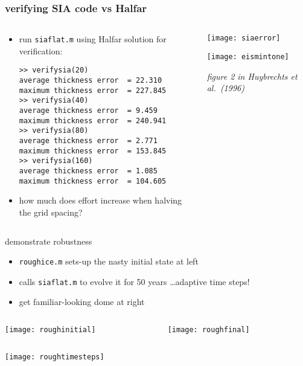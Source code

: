 \begin{frame}[fragile]
\frametitle{verifying SIA code vs Halfar}
\label{slide:verifysia}

\begin{columns}
\begin{column}{0.55\textwidth}
\begin{itemize}
\item run \texttt{siaflat.m} using Halfar solution for verification:
\scriptsize
\begin{verbatim}
>> verifysia(20)
average thickness error  = 22.310
maximum thickness error  = 227.845
>> verifysia(40)
average thickness error  = 9.459
maximum thickness error  = 240.941
>> verifysia(80)
average thickness error  = 2.771
maximum thickness error  = 153.845
>> verifysia(160)
average thickness error  = 1.085
maximum thickness error  = 104.605
\end{verbatim}
\normalsize

\medskip
\item how much does effort increase when halving the grid spacing?
\end{itemize}
\end{column}
\begin{column}{0.45\textwidth}
\texttt{[image: siaerror]}

\bigskip\medskip

\hfill \texttt{[image: eismintone]}

\scriptsize \hfill \emph{figure 2 in Huybrechts et al.~(1996)}
\end{column}
\end{columns}
\end{frame}


\begin{frame}{demonstrate robustness}

\begin{itemize}
\item \texttt{roughice.m} sets-up the nasty initial state at left
\item calls \texttt{siaflat.m} to evolve it for 50 years \dots adaptive time steps!
\item get familiar-looking dome at right
\end{itemize}

\begin{columns}
\begin{column}{0.5\textwidth}
\texttt{[image: roughinitial]}
\end{column}
\begin{column}{0.5\textwidth}
\hfill \texttt{[image: roughfinal]}
\end{column}
\end{columns}

\vspace{-2mm}
\begin{center}
\texttt{[image: roughtimesteps]}
\end{center}
\end{frame}


